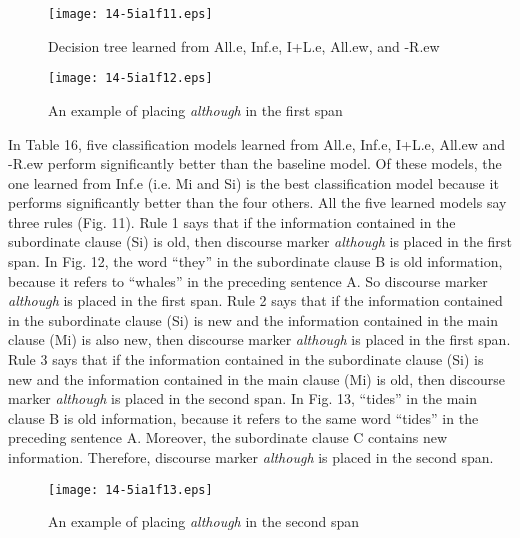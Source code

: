 \documentclass[english]{jnlp_1.3e}
\begin{document}
\begin{table}[b]

\end{table}
\begin{figure}[b]
\begin{center}
\texttt{[image: 14-5ia1f11.eps]}
\end{center}
 \caption{Decision tree learned from All.e, Inf.e, I+L.e, All.ew, and -R.ew}
\end{figure}
\begin{figure}[b]
\begin{center}
\texttt{[image: 14-5ia1f12.eps]}
\end{center}
 \caption{An example of placing \textit{although} in the first span}
\end{figure}




In Table 16, five classification models learned from All.e, Inf.e, I+L.e, 
All.ew and -R.ew perform significantly better than the baseline model.
Of these models, the one learned from Inf.e (i.e. Mi and Si) 
is the best classification model because it performs significantly better 
than the four others. All the five learned models 
say three rules (Fig. 11). Rule 1 says that if the information
contained in the subordinate clause (Si) is old, then discourse marker \textit{although} 
is placed in the first span. In Fig. 12, the word ``they'' in the subordinate
clause B is old information, because it 
refers to ``whales'' in the preceding sentence A. So discourse marker
\textit{although} is placed in the first span. Rule 2 says that 
if the information contained in the subordinate clause (Si) is new and the information
contained in the main clause (Mi) is also new, then discourse marker \textit{although}
is placed in the first span. Rule 3 says that if the information contained in the 
subordinate clause (Si) is new and the information contained in the main 
clause (Mi) is old, then discourse marker \textit{although} is placed in the second span. 
In Fig. 13, ``tides'' in the main clause 
B is old information, because it refers to the same word ``tides'' 
in the preceding sentence A. Moreover, the subordinate clause C 
contains new information. Therefore, discourse marker \textit{although}
is placed in the second span. 

\begin{figure}[t]
\begin{center}
\texttt{[image: 14-5ia1f13.eps]}
\end{center}
 \caption{An example of placing \textit{although} in the second span}
\end{figure}
\begin{table}[t]

\end{table}
\end{document}
